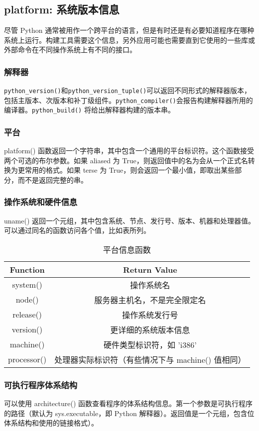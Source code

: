 \chapter{}
\section{platform: 系统版本信息}
尽管 Python 通常被用作一个跨平台的语言，但是有时还是有必要知道程序在哪种系统上运行。构建工具需要这个信息，另外应用可能也需要直到它使用的一些库或外部命令在不同操作系统上有不同的接口。

\subsection{解释器}
\verb|python_version()|和\verb|python_version_tuple()|可以返回不同形式的解释器版本，包括主版本、次版本和补丁级组件。\verb|python_compiler()|会报告构建解释器所用的编译器。\verb|python_build()| 将给出解释器构建的版本串。

\subsection{平台}
platform() 函数返回一个字符串，其中包含一个通用的平台标识符。这个函数接受两个可选的布尔参数。如果 aliased 为 True，则返回值中的名为会从一个正式名转换为更常用的格式。如果 terse 为 True，则会返回一个最小值，即取出某些部分，而不是返回完整的串。

\subsection{操作系统和硬件信息}
uname() 返回一个元组，其中包含系统、节点、发行号、版本、机器和处理器值。可以通过同名的函数访问各个值，比如表所列。
\begin{table}
    \centering
    \caption{平台信息函数}
    \label{tbl17.3}
    \begin{tabular}{cc}
        \hline
        Function    & Return Value                   \\
        \hline
        system()    & 操作系统名                          \\
        node()      & 服务器主机名，不是完全限定名                 \\
        release()   & 操作系统发行号                        \\
        version()   & 更详细的系统版本信息                     \\
        machine()   & 硬件类型标识符，如 'i386'               \\
        processor() & 处理器实际标识符（有些情况下与 machine() 值相同） \\
        \hline
    \end{tabular}
\end{table}
\subsection{可执行程序体系结构}
可以使用 architecture() 函数查看程序的体系结构信息。第一个参数是可执行程序的路径（默认为 sys.executable，即 Python 解释器）。返回值是一个元组，包含位体系结构和使用的链接格式）。